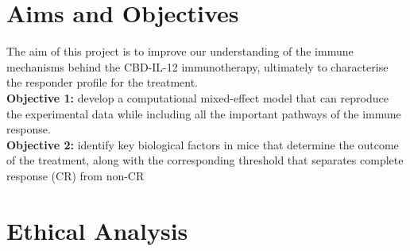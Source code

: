 \documentclass[11pt]{article}
\begin{document}

\section{Aims and Objectives}
\noindent The aim of this project is to improve our understanding of the immune mechanisms behind the CBD-IL-12 immunotherapy, ultimately to characterise the responder profile for the treatment.\\[8pt]
\textbf{Objective 1:} develop a computational mixed-effect model that can reproduce the experimental data while including all the important pathways of the immune response.\\ 
\textbf{Objective 2:} identify key biological factors in mice that determine the outcome of the treatment, along with the corresponding threshold that separates complete response (CR) from non-CR 

\section{Ethical Analysis}
\end{document}
